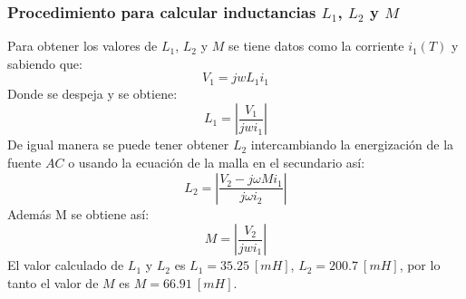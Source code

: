 \documentclass[twocolumn]{IEEEtran}
\begin{document}
\subsubsection{Procedimiento para calcular inductancias $L_1$, $L_2$ y $M$}
Para obtener los valores de $L_1$, $L_2$ y $M$ se tiene datos como la corriente $i_1(T)$ y sabiendo que:
\begin{equation}
 V_1=jwL_1i_1
\label{ecu50}
\end{equation}
\noindent
Donde se despeja y se obtiene:
\begin{equation}
 L_1=|\frac{V_1}{jw i_1}|
\label{ecu51}
\end{equation}
\noindent
De igual manera se puede tener obtener $L_2$ intercambiando la energización de la fuente $AC$ o usando la ecuación de la malla en el secundario así:
\begin{equation}
 {L_2} = |\frac {V_2-j\omega M{i_1}}{j\omega {i_2} }|
\label{equ13}
\end{equation}
\noindent
Además M se obtiene así:
\begin{equation}
 M=|\frac{V_2}{jw i_1}|
\label{ecu52}
\end{equation}
\noindent
El valor calculado de $L_1$ y $L_2$ es $L_1 =35.25\ [mH]$, $L_2 =200.7\ [mH]$, por lo tanto el valor de $M$ es $M =66.91\ [mH]$.
\end{document}
